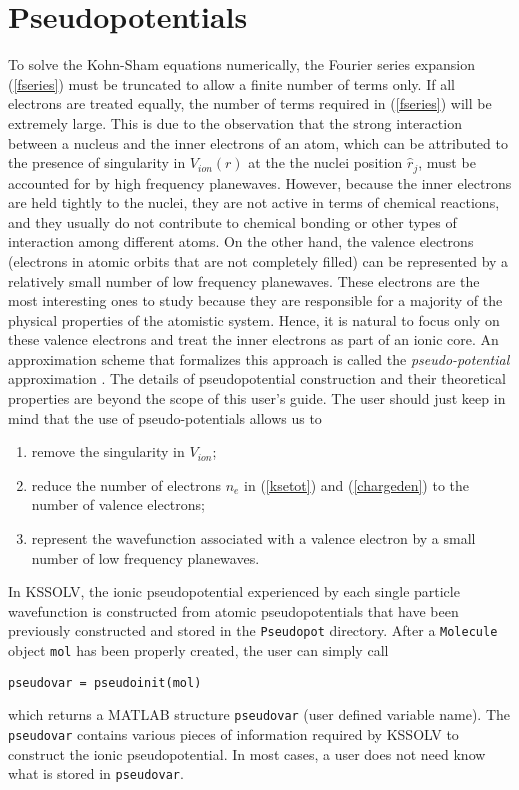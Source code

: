 \documentclass[11pt]{book}
\begin{document}
\section{Pseudopotentials}\label{sec:pseudopot}
To solve the Kohn-Sham equations numerically, the Fourier series expansion
(\ref{fseries}) must be truncated to allow a finite number of terms only. If all
electrons are treated equally, the number of terms required in (\ref{fseries}) 
will be extremely large.  This is due to the observation that the strong 
interaction between a nucleus and the inner electrons of an atom, which
can be attributed to the presence of singularity in $V_{ion}(r)$ at the 
the nuclei position $\hat{r}_j$, must be accounted for by high frequency 
planewaves. However, because the inner
electrons are held tightly to the nuclei, they are not active in terms of
chemical reactions, and they usually do not contribute to chemical bonding or 
other types of interaction among different atoms.  On the other hand, the 
valence electrons (electrons in atomic orbits that are not 
completely filled) can be represented by a relatively small number of 
low frequency planewaves. These electrons are the most interesting ones to 
study because they are responsible for a majority of the physical properties 
of the atomistic system. Hence, it is natural to focus only on these valence 
electrons and treat the inner electrons as part of an ionic core. An 
approximation scheme that formalizes this approach is called the 
{\em pseudo-potential} approximation \cite{phillips58,pk59,yincohen82}.
The details of pseudopotential construction and their theoretical properties
are beyond the scope of this user's guide.  The user should just keep in 
mind that the use of pseudo-potentials allows us to
\begin{enumerate}
\item remove the singularity in $V_{ion}$;
\item reduce the number of electrons $n_e$ in (\ref{ksetot}) and 
      (\ref{chargeden}) to the number of valence electrons;
\item represent the wavefunction associated with a valence electron
      by a small number of low frequency planewaves.
\end{enumerate}

In KSSOLV, the ionic pseudopotential experienced by each single particle
wavefunction is constructed from atomic pseudopotentials that have been
previously constructed and stored in the {\tt Pseudopot} directory.  After
a {\tt Molecule} object {\tt mol} has been properly created, the user
can simply call 
\begin{verbatim}
pseudovar = pseudoinit(mol)
\end{verbatim}
which returns a MATLAB structure {\tt pseudovar} (user defined
variable name).  The {\tt pseudovar} contains various pieces of information
required by KSSOLV to construct the ionic pseudopotential.  In most
cases, a user does not need know what is stored in {\tt pseudovar}. 
\end{document}
